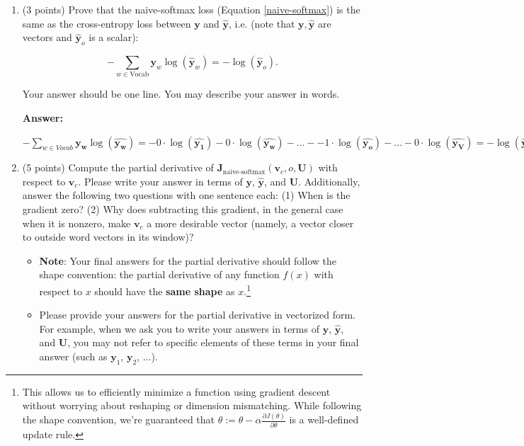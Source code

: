 \documentclass{article}
\newenvironment{answer}{
        {\bf Answer:} \sf \begingroup\color{red}
    }{\endgroup}%
\begin{document}
    \clearpage
    \begin{enumerate}
        [label=(\alph*)]
        \item (3 points)
        Prove that the naive-softmax loss (Equation \ref{naive-softmax}) is the same as the cross-entropy loss between $\bm y$ and $\hat{\bm y}$, i.e. (note that $\bm y, \hat{\bm y}$ are vectors and $\hat{\bm y}_o$ is a scalar):

        \begin{equation}
            -\sum_{w \in \text{Vocab}} \bm y_w \log(\hat{\bm y}_w) = - \log (\hat{\bm y}_o).
        \end{equation}

        Your answer should be one line. You may describe your answer in words.
        \begin{shaded}
            \begin{answer}
                $ - \sum_{w \in Vocab} \bm{y_w} \log(\hat{\bm{y_w}}) =
                - 0 \cdot \log(\hat{\bm{y_1}}) - 0 \cdot \log(\hat{\bm{y_w}}) - \dots -
                - 1 \cdot \log(\hat{\bm{y_o}}) - \dots - 0 \cdot \log(\hat{\bm{y_V}}) =
                - \log(\hat{\bm{y_o}}) $
            \end{answer}
        \end{shaded}

        \item (5 points) Compute the partial derivative of $\bm J_{\text{naive-softmax}}(\bm v_c, o, \bm U)$ with respect to $\bm v_c$. Please write your answer in terms of $\bm y$, $\hat{\bm y}$, and $\bm U$. Additionally, answer the following two questions with one sentence each: (1) When is the gradient zero? (2) Why does subtracting this gradient, in the general case when it is nonzero, make $\bm v_c$ a more desirable vector (namely, a vector closer to outside word vectors in its window)?

        \begin{itemize}
            \item \textbf{Note}: Your final answers for the partial derivative should follow the shape convention: the partial derivative of any function $f(x)$ with respect to $x$ should have the \textbf{same shape} as $x$.\footnote{This allows us to efficiently minimize a function using gradient descent without worrying about reshaping or dimension mismatching. While following the shape convention, we're guaranteed that $\theta:= \theta - \alpha\frac{\partial J(\theta)}{\partial \theta}$ is a well-defined update rule.}
            \item Please provide your answers for the partial derivative in vectorized form. For example, when we ask you to write your answers in terms of $\bm y$, $\hat{\bm y}$, and $\bm U$, you may not refer to specific elements of these terms in your final answer (such as $\bm y_1$, $\bm y_2$, $\dots$).
        \end{itemize}




\end{enumerate}
\end{document}
